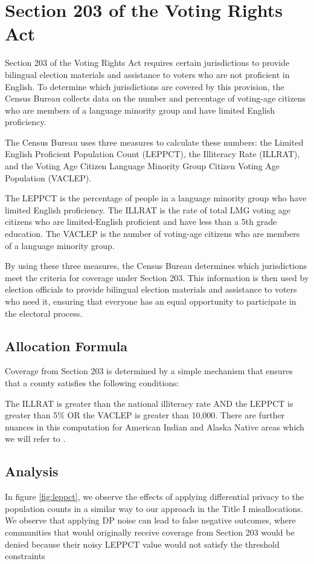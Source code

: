 \section*{Section 203 of the Voting Rights Act}



Section 203 of the Voting Rights Act requires certain jurisdictions to provide bilingual election materials and
assistance to voters who are not proficient in English. To determine which jurisdictions are covered by this provision,
the Census Bureau collects data on the number and percentage of voting-age citizens who are members of a language
minority group and have limited English proficiency.

The Census Bureau uses three measures to calculate these numbers: the Limited English Proficient Population Count
(LEPPCT), the Illiteracy Rate (ILLRAT), and the Voting Age Citizen Language Minority Group Citizen Voting Age
Population (VACLEP).

The LEPPCT is the percentage of people in a language minority group who have limited English proficiency. The ILLRAT
is the rate of total LMG voting age citizens who are limited-English proficient and have less than a 5th grade
education. The VACLEP is the number of voting-age citizens who are members of a language minority group.

By using these three measures, the Census Bureau determines which jurisdictions meet the criteria for coverage under
Section 203. This information is then used by election officials to provide bilingual election materials and assistance
to voters who need it, ensuring that everyone has an equal opportunity to participate in the electoral process.

\subsection*{Allocation Formula}
Coverage from Section 203 is determined by a simple mechanism that ensures that a county satisfies the following conditions:

The ILLRAT is greater than the national illiteracy rate AND the LEPPCT is greater than 5\% OR the VACLEP is greater than
10,000. There are further nuances in this computation for American Indian and Alaska Native areas which we will refer
to \cite{Census203}.

\subsection*{Analysis}
In figure \ref{fig:leppct}, we observe the effects of applying differential privacy to the population counts in a similar
way to our approach in the Title I misallocations. We observe that applying DP noise can lead to false negative
outcomes, where communities that would originally receive coverage from Section 203 would be denied because their noisy
LEPPCT value would not satisfy the threshold constraints
